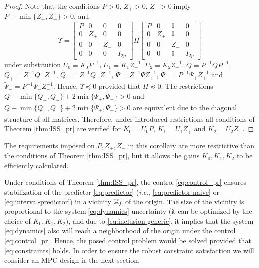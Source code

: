\documentclass[letterpaper, 10 pt, conference]{ieeeconf}  %
\begin{document}
\begin{proof}
Note that the conditions $P>0$, $Z_{+}>0$, $Z_{-}>0$ imply $P+\min\{Z_{+},Z_{-}\}>0$,
and 
\[
\Upsilon=\left[\begin{array}{cccc}
P & 0 & 0 & 0\\
0 & Z_{+} & 0 & 0\\
0 & 0 & Z_{-} & 0\\
0 & 0 & 0 & I_{2p}
\end{array}\right]\Pi\left[\begin{array}{cccc}
P & 0 & 0 & 0\\
0 & Z_{+} & 0 & 0\\
0 & 0 & Z_{-} & 0\\
0 & 0 & 0 & I_{2p}
\end{array}\right]
\]
under substitution $U_{0}=K_{0}P^{-1}$, $U_{1}=K_{1}Z_{+}^{-1}$,
$U_{2}=K_{2}Z_{-}^{-1}$, $\tilde{Q}=P^{-1}QP^{-1}$, $\tilde{Q}_{+}=Z_{+}^{-1}Q_{+}Z_{+}^{-1}$,
$\tilde{Q}_{-}=Z_{-}^{-1}Q_{-}Z_{-}^{-1}$, $\tilde{\Psi}=Z_{-}^{-1}\Psi Z_{+}^{-1}$,
$\tilde{\Psi}_{+}=P^{-1}\Psi_{+}Z_{+}^{-1}$ and $\tilde{\Psi}_{-}=P^{-1}\Psi_{-}Z_{-}^{-1}$.
Hence, $\Upsilon\preceq0$ provided that $\Pi\preceq0$. The restrictions
$\tilde{Q}+\min\{\tilde{Q}_{+},\tilde{Q}_{-}\}+2\min\{\tilde{\Psi}_{+},\tilde{\Psi}_{-}\}>0$
and $Q+\min\{Q_{+},Q_{-}\}+2\min\{\Psi_{+},\Psi_{-}\}>0$ are equivalent
due to the diagonal structure of all matrices. Therefore, under introduced
restrictions all conditions of Theorem \ref{thm:ISS_pr} are verified
for $K_{0}=U_{0}P$, $K_{1}=U_{1}Z_{+}$ and $K_{2}=U_{2}Z_{-}$.
\end{proof}
The requirements imposed on $P,Z_{+},Z_{-}$ in this corollary are
more restrictive than the conditions of Theorem \ref{thm:ISS_pr},
but it allows the gains $K_{0},K_{1},K_{2}$ to be efficiently calculated.

Under conditions of Theorem \ref{thm:ISS_pr}, the control \eqref{eq:control_pr}
ensures stabilization of the predictor \eqref{eq:predictor} (\emph{i.e}.,
\eqref{eq:predictor-naive} or \eqref{eq:interval-predictor}) in
a vicinity $\mathbb{X}_{f}$ of the origin. The size of the vicinity is proportional
to the system \eqref{eq:dynamics} uncertainty (it can be optimized
by the choice of $K_{0},K_{1},K_{2}$), and due to \eqref{eq:inclusion-generic},
it implies that the system \eqref{eq:dynamics} also will reach a
neighborhood of the origin under the control \eqref{eq:control_pr}.
Hence, the posed control problem would be solved provided that \eqref{eq:constraints}
holds. In order to ensure the robust constraint satisfaction we will
consider an MPC design in the next section.
\end{document}
